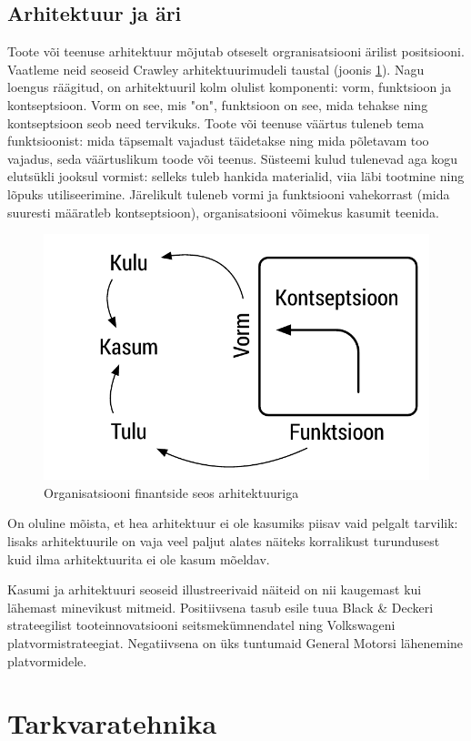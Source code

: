 \documentclass{article}
\begin{document}
\subsection{Arhitektuur ja äri}
Toote või teenuse arhitektuur mõjutab otseselt orgranisatsiooni ärilist positsiooni. Vaatleme neid seoseid Crawley arhitektuurimudeli taustal (joonis \ref{fig:arh}). Nagu loengus räägitud, on arhitektuuril kolm olulist komponenti: vorm, funktsioon ja kontseptsioon. Vorm on see, mis "on", funktsioon on see, mida tehakse ning kontseptsioon seob need tervikuks. Toote või teenuse väärtus tuleneb tema funktsioonist: mida täpsemalt vajadust täidetakse ning mida põletavam too vajadus, seda väärtuslikum toode või teenus. Süsteemi kulud tulenevad aga kogu elutsükli jooksul vormist: selleks tuleb hankida materialid, viia läbi tootmine ning lõpuks utiliseerimine. Järelikult tuleneb vormi ja funktsiooni vahekorrast (mida suuresti määratleb kontseptsioon), organisatsiooni võimekus kasumit teenida.

\begin{figure}[htp]
	\begin{center}
		\includegraphics[width=.6\textwidth]{ffc_profit.pdf}
		\caption{Organisatsiooni finantside seos arhitektuuriga}
		\label{fig:arh}
	\end{center}
\end{figure}


On oluline mõista, et hea arhitektuur ei ole kasumiks piisav vaid pelgalt tarvilik: lisaks arhitektuurile on vaja veel paljut alates näiteks korralikust turundusest kuid ilma arhitektuurita ei ole kasum mõeldav. 

Kasumi ja arhitektuuri seoseid illustreerivaid näiteid on nii kaugemast kui lähemast minevikust mitmeid. Positiivsena tasub esile tuua Black \& Deckeri strateegilist tooteinnovatsiooni seitsmekümnendatel ning Volkswageni platvormistrateegiat. Negatiivsena on üks tuntumaid General Motorsi lähenemine platvormidele. 


\section{Tarkvaratehnika}
\end{document}
